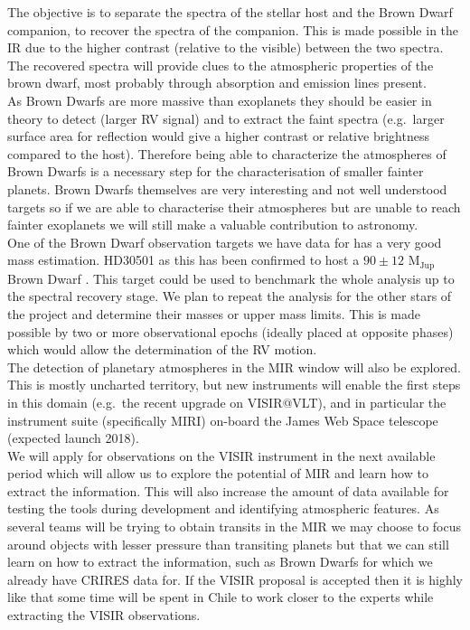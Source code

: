 \documentclass[pdftex,12pt,a4paper]{article}
\begin{document}
The objective is to separate the spectra of the stellar host and the Brown Dwarf companion, to recover the spectra of the companion. This is made possible in the IR due to the higher contrast (relative to the visible) between the two spectra. The recovered spectra will provide clues to the atmospheric properties of the brown dwarf, most probably through absorption and emission lines present. \\

As Brown Dwarfs are more massive than exoplanets they should be easier in theory to detect (larger {RV} signal) and to extract the faint spectra (e.g.\ larger surface area for reflection would give a higher contrast or relative brightness compared to the host). Therefore being able to characterize the atmospheres of Brown Dwarfs is a necessary step for the characterisation of smaller fainter planets. Brown Dwarfs themselves are very interesting and not well understood targets so if we are able to characterise their atmospheres but are unable to reach fainter exoplanets we will still make a valuable contribution to astronomy. \\

One of the Brown Dwarf observation targets we have data for has a very good mass estimation. HD30501 as this has been confirmed to host a $90\pm12$ M$_{\textrm{Jup}}$ Brown Dwarf \citep{Sahlmann2011}. This target could be used to benchmark the whole analysis up to the spectral recovery stage. We plan to repeat the analysis for the other stars of the project and determine their masses or upper mass limits. This is made possible by two or more observational epochs (ideally placed at opposite phases) which would allow the determination of the {RV} motion. \\

The detection of planetary atmospheres in the MIR window will also be explored. This is mostly uncharted territory, but new instruments will enable the first steps in this domain (e.g.\ the recent upgrade on VISIR@VLT), and in particular the instrument suite (specifically MIRI) on-board the James Web Space telescope (expected launch 2018). \\

We will apply for observations on the VISIR instrument in the next available period which will allow us to explore the potential of MIR and learn how to extract the information. This will also increase the amount of data available for testing the tools during development and identifying atmospheric features. As several teams will be trying to obtain transits in the MIR we may choose to focus around objects with lesser pressure than transiting planets but that we can still learn on how to extract the information, such as Brown Dwarfs for which we already have CRIRES data for. If the VISIR proposal is accepted then it is highly like that some time will be spent in Chile to work closer to the experts while extracting the VISIR observations.\\
\end{document}
